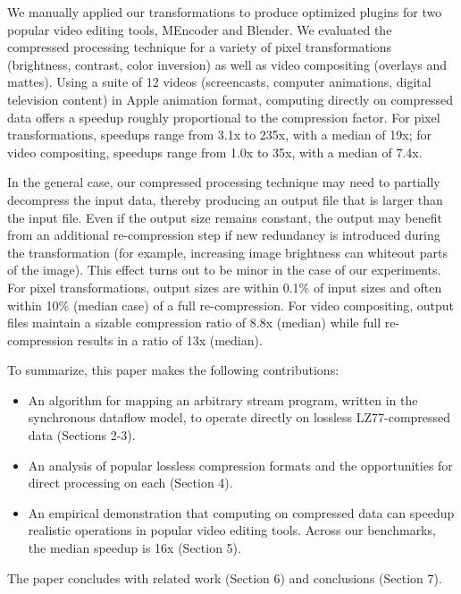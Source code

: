 We manually applied our transformations to produce optimized plugins
for two popular video editing tools, MEncoder and Blender.  We
evaluated the compressed processing technique for a variety of pixel
transformations (brightness, contrast, color inversion) as well as
video compositing (overlays and mattes).  Using a suite of 12 videos
(screencasts, computer animations, digital television content) in
Apple animation format, computing directly on compressed data offers a
speedup roughly proportional to the compression factor.  For pixel
transformations, speedups range from 3.1x to 235x, with a median of
19x; for video compositing, speedups range from 1.0x to 35x, with a
median of 7.4x.

In the general case, our compressed processing technique may need to
partially decompress the input data, thereby producing an output file
that is larger than the input file.  Even if the output size remains
constant, the output may benefit from an additional re-compression
step if new redundancy is introduced during the transformation (for
example, increasing image brightness can whiteout parts of the image).
This effect turns out to be minor in the case of our experiments.  For
pixel transformations, output sizes are within 0.1\% of input sizes
and often within 10\% (median case) of a full re-compression.  For
video compositing, output files maintain a sizable compression ratio
of 8.8x (median) while full re-compression results in a ratio of 13x
(median).

To summarize, this paper makes the following contributions:
\begin{itemize}

\item An algorithm for mapping an arbitrary stream program, written in
the synchronous dataflow model, to operate directly on lossless
LZ77-compressed data (Sections 2-3).

\item An analysis of popular lossless compression formats and the
opportunities for direct processing on each (Section 4).

\item An empirical demonstration that computing on compressed data can
speedup realistic operations in popular video editing tools.  Across
our benchmarks, the median speedup is 16x (Section 5).

\end{itemize}

The paper concludes with related work (Section 6) and conclusions
(Section 7).
